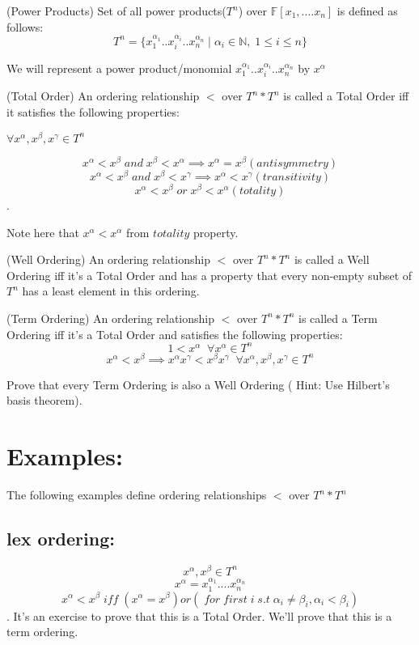 \begin{definition}(Power Products)
Set of all power products($T^n$) over $\mathbb{F}[x_1,....x_n]$ is defined as follows:
$$T^n=\{x_{1}^{\alpha_{1}}..x_{i}^{\alpha_{i}}..x_{n}^{\alpha_{n}}\;|\; \alpha_{i}\in \mathbb{N},\;1\leq i\leq n\}$$
\end{definition}
We will represent a power product/monomial $x_{1}^{\alpha_{1}}..x_{i}^{\alpha_{i}}..x_{n}^{\alpha_{n}}$ by $x^{\alpha}$ 
\begin{definition}(Total Order)
An ordering relationship $<$ over $T^n*T^n$ is called a Total Order iff it satisfies the following properties:

$ \forall x^{\alpha},x^{\beta},x^{\gamma} \in T^n$

$$ x^{\alpha} < x^{\beta}\; and \;x^{\beta} < x^{\alpha} \implies x^{\alpha} = x^{\beta} (antisymmetry)$$
$$ x^{\alpha} < x^{\beta} \;and\; x^{\beta} < x^{\gamma} \implies x^{\alpha} < x^{\gamma} (transitivity)$$
$$x^{\alpha} < x^{\beta} \;or\; x^{\beta} < x^{\alpha} (totality)$$.

Note here that $x^{\alpha} < x^{\alpha}$ from $totality$ property.
\end{definition}

\begin{definition}(Well Ordering)
An ordering relationship $<$ over $T^n*T^n$ is called a Well Ordering iff it's a Total Order and has a property that every non-empty subset of $T^n$ has a least element in this ordering.
\end{definition}

\begin{definition}(Term Ordering)
An ordering relationship $<$ over $T^n*T^n$ is called a Term Ordering iff it's a Total Order and satisfies the following properties:
$$1<x^{\alpha}\;\; \forall x^{\alpha}\in T^n$$
$$x^{\alpha}<x^{\beta}\implies x^{\alpha}x^{\gamma}<x^{\beta}x^{\gamma}\;\;\forall x^{\alpha},x^{\beta},x^{\gamma}\in T^n$$
\end{definition}

\begin{exercise}
Prove that every Term Ordering is also a Well Ordering ( Hint: Use Hilbert's basis theorem).
\end{exercise}
\section*{Examples:}
The following examples define ordering relationships $<$ over $T^{n}*T^{n}$
\subsection*{lex ordering:}
$$x^{\alpha},x^{\beta} \in T^{n}$$
$$x^{\alpha}=x_{1}^{\alpha_{1}}....x_{n}^{\alpha_{n}}$$
$$x^{\alpha}<x^{\beta}\; iff \;(x^{\alpha}=x^{\beta}) or ( \;for \;first \;i \;s.t\; \alpha_{i}\neq \beta_{i} , \alpha_{i}<\beta_{i})$$.
It's an exercise to prove that this is a Total Order. We'll prove that this is a term ordering.

